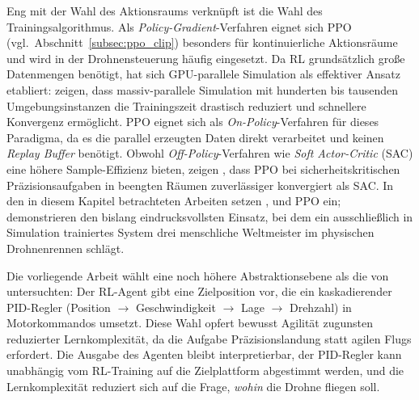 Eng mit der Wahl des Aktionsraums verknüpft ist die Wahl des Trainingsalgorithmus. Als \textit{Policy-Gradient}-Verfahren eignet sich PPO (vgl.\ Abschnitt~\ref{subsec:ppo_clip}) besonders für kontinuierliche Aktionsräume und wird in der Drohnensteuerung häufig eingesetzt. Da RL grundsätzlich große Datenmengen benötigt, hat sich GPU-parallele Simulation als effektiver Ansatz etabliert: \textcite{rudinLearningWalkMinutes2022} zeigen, dass massiv-parallele Simulation mit hunderten bis tausenden Umgebungsinstanzen die Trainingszeit drastisch reduziert und schnellere Konvergenz ermöglicht. PPO eignet sich als \textit{On-Policy}-Verfahren für dieses Paradigma, da es die parallel erzeugten Daten direkt verarbeitet und keinen \textit{Replay Buffer} benötigt. Obwohl \textit{Off-Policy}-Verfahren wie \textit{Soft Actor-Critic} (SAC) eine höhere Sample-Effizienz bieten, zeigen \textcite{tayarAutonomousUAVFlight2025}, dass PPO bei sicherheitskritischen Präzisionsaufgaben in beengten Räumen zuverlässiger konvergiert als SAC. In den in diesem Kapitel betrachteten Arbeiten setzen \textcite{bartolomeiAutonomousEmergencyLanding2022}, \textcite{xuNavRLLearningSafe2024} und \textcite{kaufmannBenchmarkComparisonLearned2022} PPO ein; \textcite{kaufmannChampionlevelDroneRacing2023} demonstrieren den bislang eindrucksvollsten Einsatz, bei dem ein ausschließlich in Simulation trainiertes System drei menschliche Weltmeister im physischen Drohnenrennen schlägt.

Die vorliegende Arbeit wählt eine noch höhere Abstraktionsebene als die von \textcite{kaufmannBenchmarkComparisonLearned2022} untersuchten: Der RL-Agent gibt eine Zielposition vor, die ein kaskadierender PID-Regler (Position $\rightarrow$ Geschwindigkeit $\rightarrow$ Lage $\rightarrow$ Drehzahl) in Motorkommandos umsetzt. Diese Wahl opfert bewusst Agilität zugunsten reduzierter Lernkomplexität, da die Aufgabe Präzisionslandung statt agilen Flugs erfordert. Die Ausgabe des Agenten bleibt interpretierbar, der PID-Regler kann unabhängig vom RL-Training auf die Zielplattform abgestimmt werden, und die Lernkomplexität reduziert sich auf die Frage, \emph{wohin} die Drohne fliegen soll.

